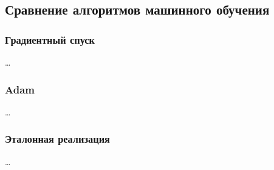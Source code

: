 \subsection{Сравнение алгоритмов машинного обучения}

\subsubsection{Градиентный спуск}

\dots

\subsubsection{Adam}

\dots

\subsubsection{Эталонная реализация}

\dots